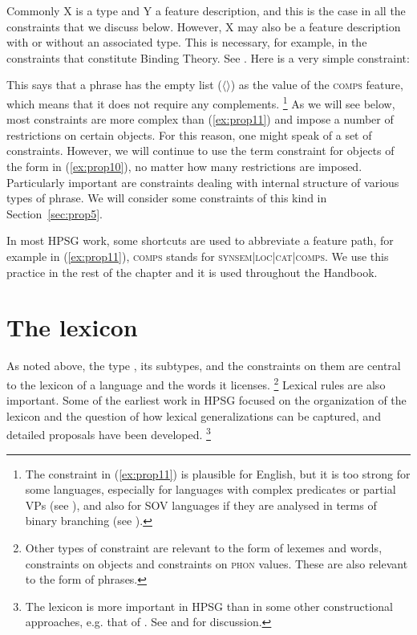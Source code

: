 \documentclass[output=paper
	        ,collection
	        ,collectionchapter
 	        ,biblatex
                ,babelshorthands
                ,newtxmath
                ,draftmode
                ,colorlinks, citecolor=brown
]{langscibook}
\begin{document}
Commonly X is a type and Y a feature description, and this is the case in all the constraints that we discuss below. However, X may also be a feature description with or without an associated type. This is necessary, for example, in the constraints that constitute Binding Theory. See . Here is a very simple constraint:

\ea
\label{ex:prop11}
\label{ex-phrase-coonstraint}
 
\z

This says that a phrase has the empty list ($\langle \rangle$) as the value of the \textsc{comps} feature, which means that it does not require any complements.%
%
\footnote{The constraint in (\ref{ex:prop11}) is plausible for English, but it is too strong for some languages, especially for languages with complex predicates or partial VPs (see ), and also for SOV languages if they are analysed in terms of binary branching (see ).}
%
As we will see below, most constraints are more complex than (\ref{ex:prop11}) and impose a number of restrictions on certain objects. For this reason, one might speak of a set of constraints. However, we will continue to use the term constraint for objects of the form in (\ref{ex:prop10}), no matter how many restrictions are imposed. Particularly important are constraints dealing with internal structure of various types of phrase. We will consider some constraints of this kind in Section~\ref{sec:prop5}.

In most HPSG work, some shortcuts are used to abbreviate a feature path, for example in (\ref{ex:prop11}), \textsc{comps} stands for \textsc{synsem|loc|cat|comps}. We use this practice in the rest of the chapter and it is used throughout the Handbook.


\section{The lexicon}\label{sec:prop4}
\label{prop:sec-lexicon}

As noted above, the type , its subtypes, and the constraints on them are central to the lexicon of a language and the words it licenses.%
%
\footnote{\label{fn-constraints-synsem-phon}%
Other types of constraint are relevant to the form of lexemes and words, \eg constraints on  objects and constraints on \textsc{phon} values. These are also relevant to the form of phrases.}
%
Lexical rules are also important. Some of the earliest work in HPSG focused on the organization of the lexicon and the question of how lexical generalizations can be captured, and detailed proposals have been developed.%
%
\footnote{The lexicon is more important in HPSG than in some other constructional approaches, e.g. that of \citet{Goldberg95a,Goldberg2006a}. See \citet{MWArgSt} and  for discussion.}
%
\end{document}
